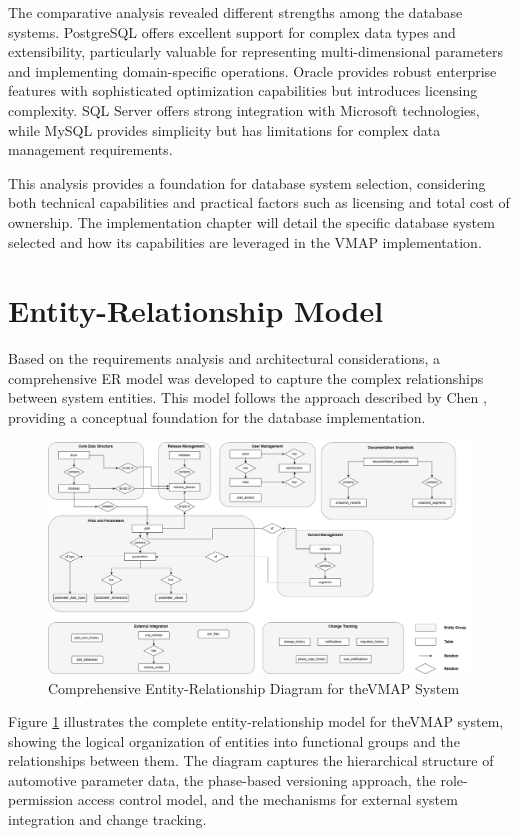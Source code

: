 The comparative analysis revealed different strengths among the database systems. PostgreSQL offers excellent support for complex data types and extensibility, particularly valuable for representing multi-dimensional parameters and implementing domain-specific operations. Oracle provides robust enterprise features with sophisticated optimization capabilities but introduces licensing complexity. SQL Server offers strong integration with Microsoft technologies, while MySQL provides simplicity but has limitations for complex data management requirements.

This analysis provides a foundation for database system selection, considering both technical capabilities and practical factors such as licensing and total cost of ownership. The implementation chapter will detail the specific database system selected and how its capabilities are leveraged in the \ac{VMAP} implementation.
\section{Entity-Relationship Model}
\label{sec:entity-relationship-model}

Based on the requirements analysis and architectural considerations, a comprehensive \ac{ER} model was developed to capture the complex relationships between system entities. This model follows the approach described by Chen \cite{chen1976entity}, providing a conceptual foundation for the database implementation.

\begin{figure}[h]
\centering
\includegraphics[width=1.0\textwidth]{figures/vmap_er_diagram.png}
\caption{Comprehensive Entity-Relationship Diagram for the\ac{VMAP} System}
\label{fig}
\end{figure}
Figure \ref{fig} illustrates the complete entity-relationship model for the\ac{VMAP} system, showing the logical organization of entities into functional groups and the relationships between them. The diagram captures the hierarchical structure of automotive parameter data, the phase-based versioning approach, the role-permission access control model, and the mechanisms for external system integration and change tracking.

